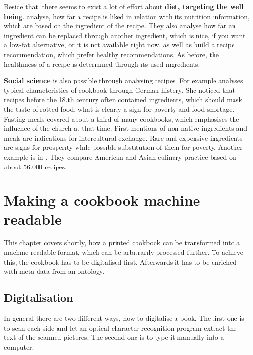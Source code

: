 \documentclass[12pt, twoside]{report}
\begin{document}
Beside that, there seems to exist a lot of effort about \textbf{diet, targeting the well being}. \parencite{ingredientNetworks} analyse, how far a recipe is liked in relation with its nutrition information, which are based on the ingredient of the recipe. They also analyse how far an ingredient can be replaced through another ingredient, which is nice, if you want a low-fat alternative, or it is not available right now. \parencite{Freyne2010} as well as \parencite{Geleijnse_extractingvegetable} build a recipe recommendation, which prefer healthy recommendations. As before, the healthiness of a recipe is determined through its used ingredients. 

\textbf{Social science} is also possible through analysing recipes. For example \parencite{BeateHenning} analyses typical characteristics of cookbook through German history. She noticed that recipes before the 18.th century often contained ingredients, which should mask the taste of rotted food, what is clearly a sign for poverty and food shortage. Fasting meals covered about a third of many cookbooks, which emphasises the influence of the church at that time. First mentions of non-native ingredients and meals are indications for intercultural exchange. Rare and expensive ingredients are signs for prosperity while possible substitution of them for poverty. Another example is in \parencite{FlavorNetwork}. They compare American and Asian culinary practice based on about 56.000 recipes.



\chapter{Making a cookbook machine readable}
This chapter covers shortly, how a printed cookbook can be transformed into a machine readable format, which can be arbitrarily processed further. To achieve this, the cookbook has to be digitalised first. Afterwards it has to be enriched with meta data from an ontology.

\section{Digitalisation}
In general there are two different ways, how to digitalise a book. The first one is to scan each side and let an optical character recognition program extract the text of the scanned pictures. The second one is to type it manually into a computer.
\end{document}
